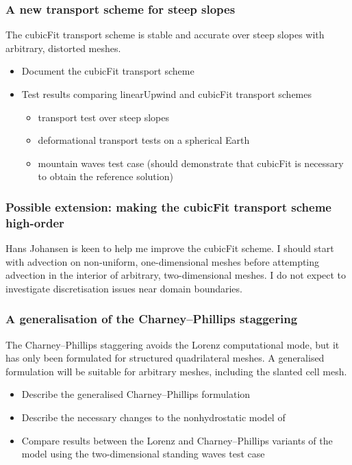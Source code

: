 \documentclass[a4paper,11pt]{article}
\begin{document}
\subsubsection*{A new transport scheme for steep slopes}
\noindent The cubicFit transport scheme is stable and accurate over steep slopes with arbitrary, distorted meshes.
\begin{itemize}[itemsep=0.1em]
	\item Document the cubicFit transport scheme
	\item {Test results comparing linearUpwind and cubicFit transport schemes
	\begin{itemize}[itemsep=0.1em,topsep=0pt]
		\item \citet{shaw2017} transport test over steep slopes 
		\item \citet{lauritzen2012} deformational transport tests on a spherical Earth
		\item \citet{schaer2002} mountain waves test case (should demonstrate that cubicFit is necessary to obtain the reference solution)
	\end{itemize}}
\end{itemize}

\subsubsection*{Possible extension: making the cubicFit transport scheme high-order}
\noindent Hans Johansen is keen to help me improve the cubicFit scheme.  I should start with advection on non-uniform, one-dimensional meshes before attempting advection in the interior of arbitrary, two-dimensional meshes.  I do not expect to investigate discretisation issues near domain boundaries.
	
\subsubsection*{A generalisation of the Charney--Phillips staggering}
\noindent The Charney--Phillips staggering avoids the Lorenz computational mode, but it has only been formulated for structured quadrilateral meshes.  A generalised formulation will be suitable for arbitrary meshes, including the slanted cell mesh.
\begin{itemize}[itemsep=0.1em]
	\item Describe the generalised Charney--Phillips formulation
	\item Describe the necessary changes to the nonhydrostatic model of \citet{weller-shahrokhi2014}
	\item Compare results between the Lorenz and Charney--Phillips variants of the model using the two-dimensional standing waves test case
\end{itemize}
\end{document}
